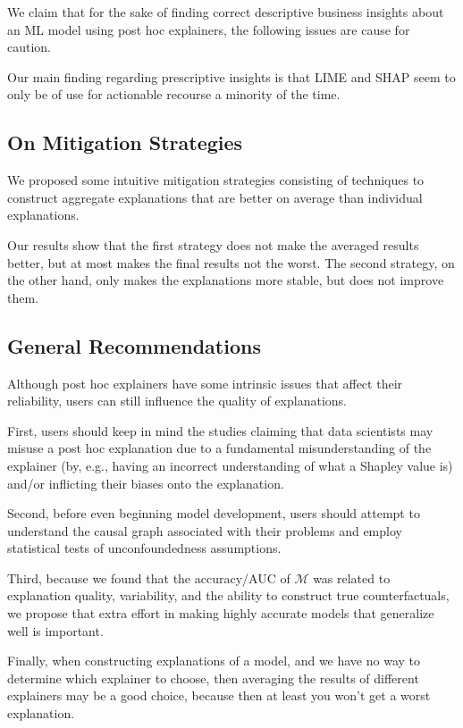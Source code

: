 \documentclass[mnsc,blindrev]{informs3}
\begin{document}
        We claim that for the sake of finding correct descriptive business insights about an ML model using post hoc explainers, the following issues are cause for caution.

        Our main finding regarding prescriptive insights is that LIME and SHAP seem to only be of use for actionable recourse a minority of the time. 
        
    \subsection{On Mitigation Strategies}
        We proposed some intuitive mitigation strategies consisting of techniques to construct aggregate explanations that are better on average than individual explanations. \par
Our results show that the first strategy does not make the averaged results better, but at most makes the final results not the worst. The second strategy, on the other hand, only makes the explanations more stable, but does not improve them.\par

    \subsection{General Recommendations}
        Although post hoc explainers have some intrinsic issues that affect their reliability, users can still influence the quality of explanations. 
        
        First, users should keep in mind the studies claiming that data scientists may misuse a post hoc explanation due to a fundamental misunderstanding of the explainer (by, e.g., having an incorrect understanding of what a Shapley value is) and/or inflicting their biases onto the explanation. 
        
        Second, before even beginning model development, users should attempt to understand the causal graph associated with their problems and employ statistical tests of unconfoundedness assumptions.  

        Third, because we found that the accuracy/AUC of $\mathcal{M}$ was related to explanation quality, variability, and the ability to construct true counterfactuals, we propose that extra effort in making highly accurate models that generalize well is important. 
        
        Finally, when constructing explanations of a model, and we have no way to determine which explainer to choose, then averaging the results of different explainers may be a good choice, because then at least you won't get a worst explanation.
\end{document}
